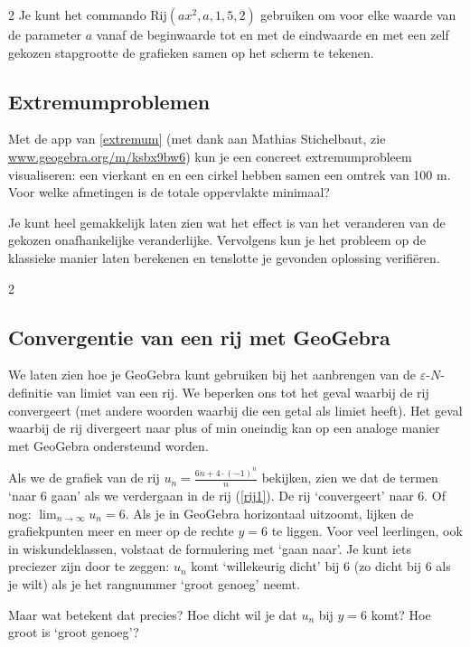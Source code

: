 \begin{multicols}{2}
Je kunt het commando Rij$(ax^2, a,1,5,2)$ gebruiken om voor elke waarde van de parameter $a$ vanaf de beginwaarde tot en met de eindwaarde en met een zelf gekozen stapgrootte de grafieken samen op het scherm te tekenen. 
	
	
\subsection{Extremumproblemen}

Met de app van \autoref{extremum} (met dank aan Mathias Stichelbaut, zie \url{www.geogebra.org/m/ksbx9bw6}) kun je een concreet extremumprobleem visualiseren: een vierkant en en een cirkel hebben samen een omtrek van 100 m. Voor welke afmetingen is de totale oppervlakte minimaal? 

Je kunt heel gemakkelijk laten zien wat het effect is van het veranderen van de gekozen onafhankelijke veranderlijke. Vervolgens kun je het probleem op de klassieke manier laten berekenen en tenslotte je gevonden oplossing verifiëren.  

\end{multicols}
	
\begin{multicols}{2}

	
	\subsection{Convergentie van een rij met \mbox{GeoGebra}}
	We laten zien hoe je GeoGebra kunt gebruiken bij het aanbrengen van de $\varepsilon$-$N$-definitie van limiet van een rij. We beperken ons tot het geval waarbij de rij convergeert (met andere woorden waarbij die een getal als limiet heeft). Het geval waarbij de rij divergeert naar plus of min oneindig kan op een analoge manier met GeoGebra ondersteund worden.
	
	Als we de grafiek van de rij $u_n=\frac{6n+4\cdot (-1)^n}{n}$ bekijken, zien we dat de termen ‘naar 6 gaan’ als we verdergaan in de rij (\autoref{rij1}). De rij ‘convergeert’ naar 6. Of nog: $\lim_{n \rightarrow \infty}{u_n}=6$. Als je in GeoGebra horizontaal uitzoomt, lijken de grafiekpunten meer en meer op de rechte $y=6$ te liggen. Voor veel leerlingen, ook in wiskundeklassen, volstaat de formulering met ‘gaan naar’. Je kunt iets preciezer zijn door te zeggen: $u_n$ komt ‘willekeurig dicht’ bij 6 (zo dicht bij 6 als je wilt) als je het rangnummer ‘groot genoeg’ neemt.
	
	
Maar wat betekent dat precies? Hoe dicht wil je dat $u_n$ bij $y=6$ komt? Hoe groot is ‘groot genoeg’?
\end{multicols}
	
